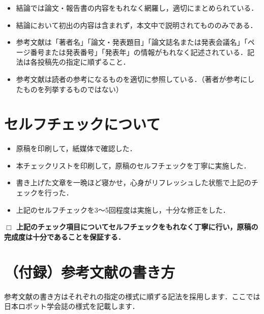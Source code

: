 \documentclass[a4paper,11pt,dvipdfmx]{jlreq}
\begin{document}
\begin{itemize}
 \item 結論では論文・報告書の内容をもれなく網羅し，適切にまとめられている．
 \item 結論において初出の内容は含まれず，本文中で説明されてもののみである．
 \item 参考文献は「著者名」「論文・発表題目」「論文誌名または発表会議名」「ページ番号または発表番号」「発表年」の情報がもれなく記述されている．記法は各投稿先の指定に順ずること．
 \item 参考文献は読者の参考になるものを適切に参照している．（著者が参考にしたものを列挙するものではない）
\end{itemize}


\section{セルフチェックについて}
\begin{itemize}
 \item 原稿を印刷して，紙媒体で確認した．
 \item 本チェックリストを印刷して，原稿のセルフチェックを丁寧に実施した．
 \item 書き上げた文章を一晩ほど寝かせ，心身がリフレッシュした状態で上記のチェックを行った．
 \item 上記のセルフチェックを3〜5回程度は実施し，十分な修正をした．
\end{itemize}

\underline{\hspace{\columnwidth}}

\textbf{\large
$\Box$ 上記のチェック項目についてセルフチェックをもれなく丁寧に行い，原稿の完成度は十分であることを保証する．
}

\newpage

\appendix
\section*{（付録）参考文献の書き方}
参考文献の書き方はそれぞれの指定の様式に順ずる記法を採用します．ここでは日本ロボット学会誌の様式を記載します．
\end{document}
